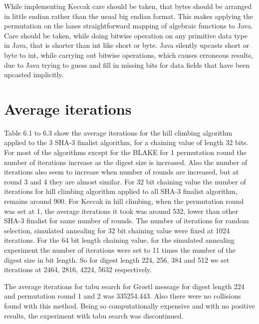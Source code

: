 While implementing Keccak care should be taken, that bytes should be arranged in little endian rather than the
usual big endian format. This makes applying the permutation on the lanes straightforward mapping of algebraic
functions to Java. Care should be taken, while doing bitwise operation on any primitive data type in Java, that
is shorter than int like short or byte. Java silently upcasts short or byte to int, while carrying out bitwise
operations, which causes erroneous results, due to Java trying to guess and fill in missing bits for data fields
that have been upcasted implicitly.

\section{Average iterations}

Table 6.1 to 6.3 show the average iterations for the hill climbing algorithm applied to the 3 SHA-3 finalist algorithm,
for a chaining value of length 32 bits. For most of the algorithms except for the BLAKE for 1 permutation round
the number of iterations increase as the digest size is increased. Also the number of iterations also seem to
increase when number of rounds are increased, but at round 3 and 4 they are almost similar. For 32 bit chaining value
the number of iterations for hill climbing algorithm applied to all SHA-3 finalist algorithm, remains around 900.
For Keccak in hill climbing, when the permutation round was set at 1, the average iterations it took was around 532,
lower than other SHA-3 finalist for same number of rounds. The number of iterations for random selection, simulated
annealing for 32 bit chaining value were fixed at 1024 iterations. For the 64 bit length chaining value, for the
simulated annealing experiment the number of iterations were set to 11 times the number of the digest size in bit
length. So for digest length 224, 256, 384 and 512 we set iterations at 2464, 2816, 4224, 5632 respectively. 

The average iterations for tabu search for Gr{\o}stl message for digest length 224 and permutation round 1 and 2
was 335254.443. Also there were no collisions found with this method. Being so computationally expensive and with
no positive results, the experiment with tabu search was discontinued.

